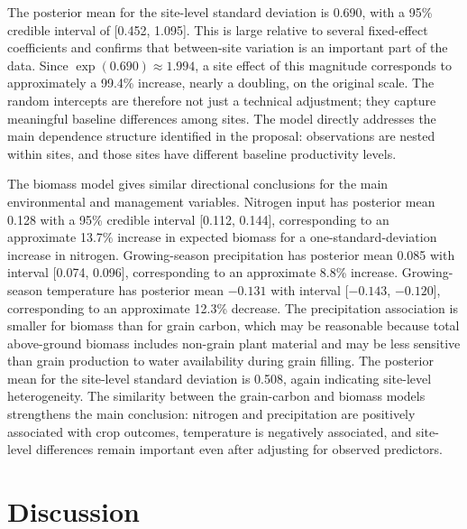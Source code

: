 \documentclass[11pt]{article}
\begin{document}
The posterior mean for the site-level standard deviation is 0.690, with a 95\% credible interval of [0.452, 1.095]. This is large relative to several fixed-effect coefficients and confirms that between-site variation is an important part of the data. Since $\exp(0.690) \approx 1.994$, a site effect of this magnitude corresponds to approximately a 99.4\% increase, nearly a doubling, on the original scale. The random intercepts are therefore not just a technical adjustment; they capture meaningful baseline differences among sites. The model directly addresses the main dependence structure identified in the proposal: observations are nested within sites, and those sites have different baseline productivity levels.

The biomass model gives similar directional conclusions for the main environmental and management variables. Nitrogen input has posterior mean 0.128 with a 95\% credible interval [0.112, 0.144], corresponding to an approximate 13.7\% increase in expected biomass for a one-standard-deviation increase in nitrogen. Growing-season precipitation has posterior mean 0.085 with interval [0.074, 0.096], corresponding to an approximate 8.8\% increase. Growing-season temperature has posterior mean $-0.131$ with interval [$-0.143$, $-0.120$], corresponding to an approximate 12.3\% decrease. The precipitation association is smaller for biomass than for grain carbon, which may be reasonable because total above-ground biomass includes non-grain plant material and may be less sensitive than grain production to water availability during grain filling. The posterior mean for the site-level standard deviation is 0.508, again indicating site-level heterogeneity. The similarity between the grain-carbon and biomass models strengthens the main conclusion: nitrogen and precipitation are positively associated with crop outcomes, temperature is negatively associated, and site-level differences remain important even after adjusting for observed predictors.

\section{Discussion}
\end{document}

